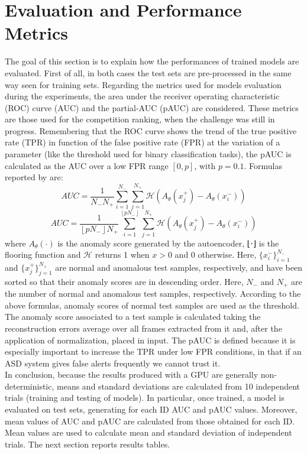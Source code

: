 \section{Evaluation and Performance Metrics}
The goal of this section is to explain how the performances of trained models are evaluated. First of all, in both cases the test sets are pre-processed in the same way seen for training sets. Regarding the metrics used for models evaluation during the experiments, the area under the receiver operating characteristic (ROC) curve (AUC) and the partial-AUC (pAUC) are considered. These metrics are those used for the competition ranking, when the challenge was still in progress. Remembering that the ROC curve shows the trend of the true positive rate (TPR) in function of the false positive rate (FPR) at the variation of a parameter (like the threshold used for binary classification tasks), the pAUC is calculated as the AUC over a low FPR range $[0,p]$, with $p=0.1$. Formulas reported by \cite{DCASE} are:
\[ AUC =\frac{1}{N_-N_+}\sum_{i=1}^{N_-}\sum_{j=1}^{N_+}\mathcal{H}(A_\theta(x_j^+)-A_\theta(x_i^-)) \]
\[AUC =\frac{1}{ \left \lfloor pN_- \right \rfloor N_+}\sum_{i=1}^{ \left \lfloor pN_- \right \rfloor }\sum_{j=1}^{N_+}\mathcal{H}(A_\theta(x_j^+)-A_\theta(x_i^-))\]
where $A_\theta(\cdot)$ is the anomaly score generated by the autoencoder, ⌊⋅⌋ is the flooring function and $\mathcal{H}$ returns 1 when $x>0$ and $0$ otherwise. Here, $\{x^−_i\}^{N_-}_{i=1}$
and $\{x^+_j\}^{N_+}_{j=1}$ are normal and anomalous test samples, respectively, and have been sorted so that their anomaly scores are in descending order. Here, $N_−$ and $N_+$
are the number of normal and anomalous test samples, respectively. According to the above formulas, anomaly scores of normal test samples are used as the threshold. The anomaly score associated to a test sample is calculated taking the reconstruction errors average over all frames extracted from it and, after the application of normalization, placed in input. The pAUC is defined because it is especially important to increase the TPR under low FPR conditions, in that if an ASD system gives false alerts frequently we cannot trust it. \\
In conclusion, because the results produced with a GPU are generally non-deterministic, means and standard deviations are calculated from 10 independent trials (training and testing of models). In particular, once trained, a model is evaluated on test sets, generating for each ID AUC and pAUC values. Moreover, mean values of AUC and pAUC are calculated from those obtained for each ID. Mean values are used to calculate mean and standard deviation of independent trials. The next section reports results tables.

